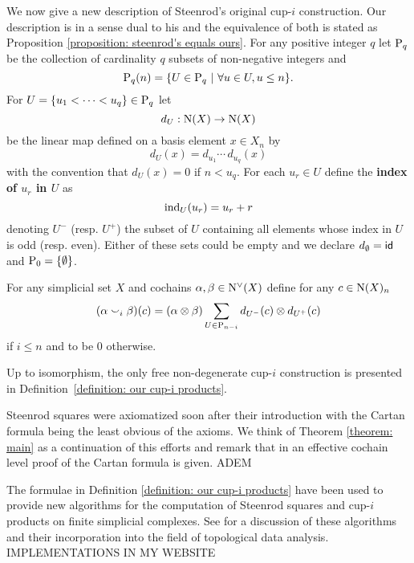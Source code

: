 We now give a new description of Steenrod's original cup-$i$ construction. Our description is in a sense dual to his and the equivalence of both is stated as Proposition \ref{proposition: steenrod's equals ours}. For any positive integer $q$ let $\P_q$ be the collection of cardinality $q$ subsets of non-negative integers and
\[
\P_q(n) = \{ U \in \P_q\ |\ \forall u \in U, u \leq n\}.
\]
 For $U = \{u_1 < \cdots < u_q\} \in \P_q$ let
\[
d_U : \chains(X) \to \chains(X)
\]
be the linear map defined on a basis element $x \in X_n$ by
\[
d_U (x) = d_{u_1} \cdots \, d_{u_q} (x)
\]
with the convention that $d_U(x) = 0$ if $n < u_q$. For each $u_r \in U$ define the \textbf{index of $u_r$ in $U$} as
\[
\ind_U(u_r) = u_r + r
\]
denoting $U^-$ (resp. $U^+$) the subset of $U$ containing all elements whose index in $U$ is odd (resp. even). Either of these sets could be empty and we declare $d_\emptyset = \id$ and $\P_0 = \{\emptyset\}$.

\begin{definition} \label{definition: our cup-i products}
	For any simplicial set $X$ and cochains $\alpha, \beta \in \cochains(X)$ define for any $c \in \chains(X)_n$
	\[
	(\alpha \cup_i \beta)(c) =
	(\alpha \tensor \beta) \sum_{U\in\P_{n-i}} d_{U^-}(c) \tensor d_{U^+}(c)
	\]
	if  $i \leq n$ and to be $0$ otherwise.
\end{definition}

\begin{theorem} \label{theorem: main}
	Up to isomorphism, the only free non-degenerate cup-$i$ construction is presented in \mbox{Definition \ref{definition: our cup-i products}}.
\end{theorem}

\begin{remark}
	Steenrod squares were axiomatized soon after their introduction with the Cartan formula being the least obvious of the axioms. We think of Theorem \ref{theorem: main} as a continuation of this efforts and remark that in \cite{medina2020cartan} an effective cochain level proof of the Cartan formula is given.
	ADEM
\end{remark}

\begin{remark}
	The formulae in Definition \ref{definition: our cup-i products} have been used to provide new algorithms for the computation of Steenrod squares and cup-$i$ products on finite simplicial complexes. See \cite{medina2018persistence} for a discussion of these algorithms and their incorporation into the field of topological data analysis. IMPLEMENTATIONS IN MY WEBSITE
\end{remark}
